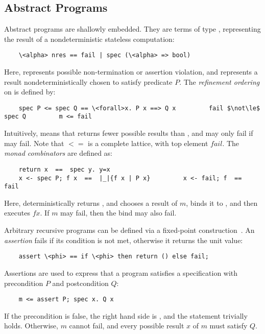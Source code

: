 \documentclass[runningheads]{llncs}
\begin{document}
  \subsection{Abstract Programs}
  Abstract programs are shallowly embedded. They are terms of type , representing the result of a nondeterministic stateless computation:
  \begin{lstlisting}
    \<alpha> nres == fail | spec (\<alpha> => bool)
  \end{lstlisting}
  Here,  represents possible non-termination or assertion violation, and  represents
  a result nondeterministically chosen to satisfy predicate $P$.
  The \emph{refinement ordering} on  is defined by:
  \begin{lstlisting}
    spec P <= spec Q == \<forall>x. P x ==> Q x         fail $\not\le$ spec Q         m <= fail
  \end{lstlisting}
  Intuitively,  means
  that  returns fewer possible results than , and may only fail if  may fail.
  Note that \is$<=$ is a complete lattice, with top element \is$fail$.
  The \emph{monad combinators} are defined as:
  \begin{lstlisting}
    return x  ==  spec y. y=x
    x <- spec P; f x  ==  |_|{f x | P x}         x <- fail; f  ==  fail
  \end{lstlisting}
  Here,  deterministically returns , and  chooses a result of \is$m$, binds it to ,
  and then executes \is$f x$. If \is$m$ may fail, then the bind may also fail.

  Arbitrary recursive programs can be defined via a fixed-point construction~\cite{Kr10}.
  An \emph{assertion} fails if its condition is not met, otherwise it returns the unit value:
  \begin{lstlisting}
    assert \<phi> == if \<phi> then return () else fail;
  \end{lstlisting}
  Assertions are used to express that a program  satisfies a specification with
  precondition \is$P$ and postcondition \is$Q$:
  \begin{lstlisting}
    m <= assert P; spec x. Q x
  \end{lstlisting}
  If the precondition is false, the right hand side is , and the statement trivially holds.
  Otherwise, $m$ cannot fail, and every possible result $x$ of $m$ must satisfy $Q$.
\end{document}
